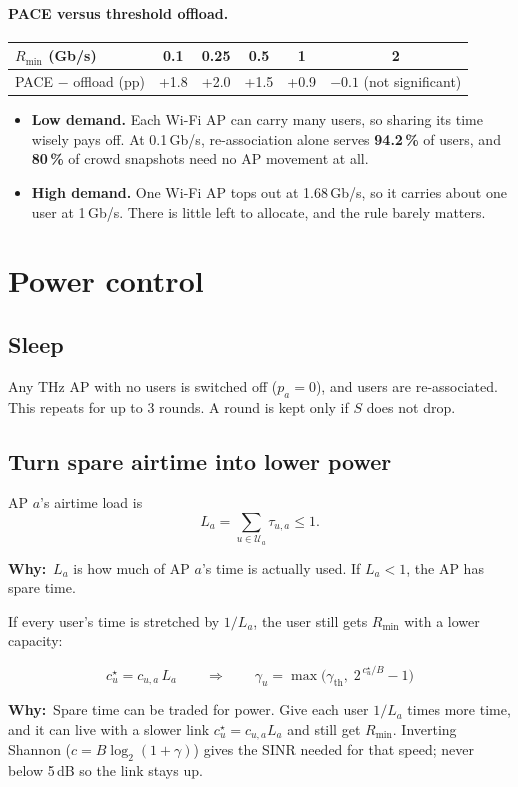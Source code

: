 \documentclass[11pt,a4paper]{article}
\newcommand{\Rmin}{R_{\min}}
\newcommand{\why}[1]{\par\smallskip\noindent\begin{minipage}{\linewidth}\small
  \textcolor{whyc}{\textbf{Why:}}~#1\end{minipage}\par\medskip}
\begin{document}
\paragraph{PACE versus threshold offload.}
\begin{center}
\begin{tabular}{@{}lccccc@{}}
\toprule
$\Rmin$ (Gb/s) & 0.1 & 0.25 & 0.5 & 1 & 2\\
\midrule
PACE $-$ offload (pp) & +1.8 & +2.0 & +1.5 & +0.9 & $-0.1$ (not significant)\\
\bottomrule
\end{tabular}
\end{center}
\begin{itemize}
\item \textbf{Low demand.} Each Wi-Fi AP can carry many users, so sharing its time wisely
  pays off. At 0.1\,Gb/s, re-association alone serves \textbf{94.2\,\%} of users, and
  \textbf{80\,\%} of crowd snapshots need no AP movement at all.
\item \textbf{High demand.} One Wi-Fi AP tops out at 1.68\,Gb/s, so it carries about one user
  at 1\,Gb/s. There is little left to allocate, and the rule barely matters.
\end{itemize}

\section{Power control}
\subsection{Sleep}
Any THz AP with no users is switched off ($p_a=0$), and users are re-associated. This
repeats for up to 3 rounds. A round is kept only if $S$ does not drop.

\subsection{Turn spare airtime into lower power}
AP $a$'s airtime load is
\[
L_a=\sum_{u\in\mathcal{U}_a}\tau_{u,a}\le1 .
\]
\why{$L_a$ is how much of AP $a$'s time is actually used. If $L_a<1$, the AP has spare time.}
If every user's time is stretched by $1/L_a$, the user still gets $\Rmin$ with a lower
capacity:
\begin{keybox}
\[
c^\star_u=c_{u,a}\,L_a
\qquad\Longrightarrow\qquad
\gamma_u=\max\!\big(\gamma_{\mathrm{th}},\;2^{\,c^\star_u/B}-1\big)
\]
\end{keybox}
\why{Spare time can be traded for power. Give each user $1/L_a$ times more time, and it can live with a slower link $c^\star_u=c_{u,a}L_a$ and still get $\Rmin$. Inverting Shannon ($c=B\log_2(1+\gamma)$) gives the SINR needed for that speed; never below 5\,dB so the link stays up.}
\end{document}
